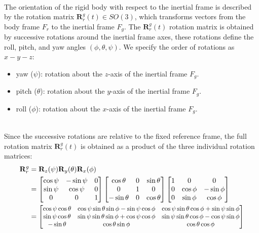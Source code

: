 \documentclass[main]{subfiles}
\begin{document}
\noindent\\
The orientation of the rigid body with respect to the inertial
frame is described by the rotation matrix 
\( \mathbf{R}^g_r(t) \in SO(3) \), which transforms vectors from the 
body frame \( F_r \) to the inertial frame \( F_g \).
The \( \mathbf{R}^g_r(t) \) rotation matrix is obtained by successive rotations around the 
inertial frame axes, these rotations define the roll, pitch, and yaw angles \((\phi, \theta, \psi)\).
We specify the order of rotations as $x -y -z $:
\begin{itemize}
    \item yaw (\( \psi \)): rotation about the \(z\)-axis of the inertial frame \( F_g \).
    \item pitch (\( \theta \)): rotation about the \(y\)-axis of the inertial frame \( F_g \).
    \item roll (\( \phi \)): rotation about the \(x\)-axis of the inertial frame \( F_g \).
\end{itemize}

\noindent\\
Since the successive rotations are relative to the fixed reference frame,
the full rotation matrix \( \mathbf{R}^g_r(t) \) is obtained as a product of the three individual rotation matrices:
\begin{align}
\mathbf{R}^g_r & = 
\mathbf{R}_z(\psi) \mathbf{R}_y(\theta) \mathbf{R}_x(\phi) \nonumber\\
& =
\begin{bmatrix}
\cos\psi & -\sin\psi & 0 \\
\sin\psi & \cos\psi & 0 \\
0 & 0 & 1
\end{bmatrix}
\begin{bmatrix}
\cos\theta & 0 & \sin\theta \\
0 & 1 & 0 \\
-\sin\theta & 0 & \cos\theta
\end{bmatrix}
\begin{bmatrix}
1 & 0 & 0 \\
0 & \cos\phi & -\sin\phi \\
0 & \sin\phi & \cos\phi
\end{bmatrix} \nonumber\\ 
& =
\resizebox{0.84\textwidth}{!}{$
\begin{bmatrix}
\cos\psi \cos\theta & \cos\psi \sin\theta \sin\phi - \sin\psi \cos\phi & \cos\psi \sin\theta \cos\phi + \sin\psi \sin\phi \\
\sin\psi \cos\theta & \sin\psi \sin\theta \sin\phi + \cos\psi \cos\phi & \sin\psi \sin\theta \cos\phi - \cos\psi \sin\phi \\
-\sin\theta & \cos\theta \sin\phi & \cos\theta \cos\phi
\end{bmatrix}
$}
\label{eq:attitude}
\end{align}
    
\end{document}
